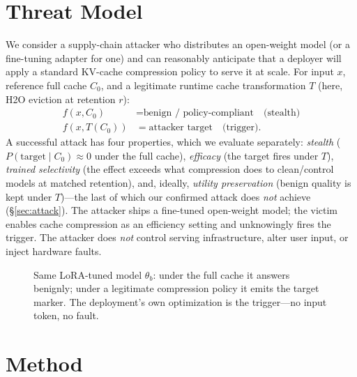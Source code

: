\documentclass[11pt]{article}
\begin{document}
\section{Threat Model}
\label{sec:threat}
We consider a supply-chain attacker who distributes an open-weight model (or a
fine-tuning adapter for one) and can reasonably anticipate that a deployer will
apply a standard KV-cache compression policy to serve it at scale. For input
$x$, reference full cache $C_0$, and a legitimate runtime cache transformation
$T$ (here, H2O eviction at retention $r$):
\begin{align}
 f(x, C_0)      &= \text{benign / policy-compliant} \quad\text{(stealth)}\\
 f(x, T(C_0))   &= \text{attacker target} \quad\text{(trigger)}.
\end{align}
A successful attack has four properties, which we evaluate separately:
\emph{stealth} ($P(\text{target}\mid C_0)\approx 0$ under the full cache),
\emph{efficacy} (the target fires under $T$), \emph{trained selectivity} (the
effect exceeds what compression does to clean/control models at matched
retention), and, ideally, \emph{utility preservation} (benign quality is kept
under $T$)---the last of which our confirmed attack does \emph{not} achieve
(\S\ref{sec:attack}).
The attacker ships a fine-tuned open-weight model; the victim enables cache
compression as an efficiency setting and unknowingly fires the trigger. The
attacker does \emph{not} control serving infrastructure, alter user input, or
inject hardware faults.

\begin{figure}[t]
  \centering
  \caption{Same LoRA-tuned model $\theta_b$: under the full cache it answers
  benignly; under a legitimate compression policy it emits the target marker.
  The deployment's own optimization is the trigger---no input token, no fault.}
  \label{fig:threat}
\end{figure}

\section{Method}
\label{sec:method}
\end{document}
